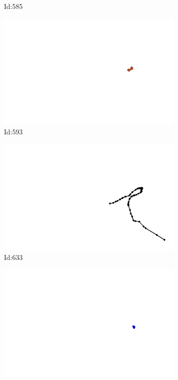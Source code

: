 \documentclass[12pt,twoside]{report}
\begin{document}
\begin{figure}
\begin{subfigure}[b]{0.20\textwidth}
\caption{Id:585}
\end{subfigure}
\begin{subfigure}[b]{0.20\textwidth}
\centering
\includegraphics[width=\textwidth]{../trajectories/593.png}
\caption{Id:593}
\end{subfigure}
\begin{subfigure}[b]{0.20\textwidth}
\centering
\includegraphics[width=\textwidth]{../trajectories/633.png}
\caption{Id:633}
\end{subfigure}
\begin{subfigure}[b]{0.20\textwidth}
\centering
\includegraphics[width=\textwidth]{../trajectories/651.png}

\end{subfigure}
\end{figure}
\end{document}
